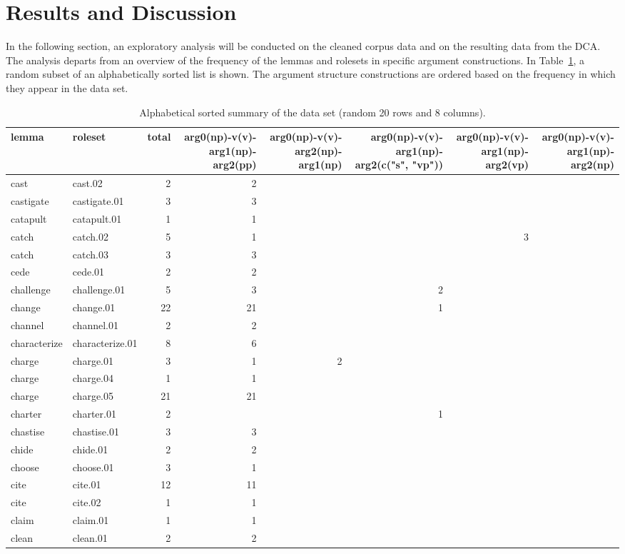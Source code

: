 \documentclass[
  letterpaper,
  DIV=11,
  numbers=noendperiod]{scrartcl}
\begin{document}
\hypertarget{results-and-discussion}{%
\section{Results and Discussion}\label{results-and-discussion}}

In the following section, an exploratory analysis will be conducted on
the cleaned corpus data and on the resulting data from the DCA. The
analysis departs from an overview of the frequency of the lemmas and
rolesets in specific argument constructions. In
Table~\ref{tbl-alph-summary}, a random subset of an alphabetically
sorted list is shown. The argument structure constructions are ordered
based on the frequency in which they appear in the data set.

\hypertarget{tbl-alph-summary}{}
\begin{table}
\caption{\label{tbl-alph-summary}Alphabetical sorted summary of the data set (random 20 rows and 8
columns). }\tabularnewline

\centering
\begin{tabular}[t]{llrrrrrr}
\toprule
lemma & roleset & total & arg0(np)-v(v)-arg1(np)-arg2(pp) & arg0(np)-v(v)-arg2(np)-arg1(np) & arg0(np)-v(v)-arg1(np)-arg2(c("s", "vp")) & arg0(np)-v(v)-arg1(np)-arg2(vp) & arg0(np)-v(v)-arg1(np)-arg2(np)\\
\midrule
cast & cast.02 & 2 & 2 &  &  &  & \\
castigate & castigate.01 & 3 & 3 &  &  &  & \\
catapult & catapult.01 & 1 & 1 &  &  &  & \\
catch & catch.02 & 5 & 1 &  &  & 3 & \\
catch & catch.03 & 3 & 3 &  &  &  & \\
\addlinespace
cede & cede.01 & 2 & 2 &  &  &  & \\
challenge & challenge.01 & 5 & 3 &  & 2 &  & \\
change & change.01 & 22 & 21 &  & 1 &  & \\
channel & channel.01 & 2 & 2 &  &  &  & \\
characterize & characterize.01 & 8 & 6 &  &  &  & \\
\addlinespace
charge & charge.01 & 3 & 1 & 2 &  &  & \\
charge & charge.04 & 1 & 1 &  &  &  & \\
charge & charge.05 & 21 & 21 &  &  &  & \\
charter & charter.01 & 2 &  &  & 1 &  & \\
chastise & chastise.01 & 3 & 3 &  &  &  & \\
\addlinespace
chide & chide.01 & 2 & 2 &  &  &  & \\
choose & choose.01 & 3 & 1 &  &  &  & \\
cite & cite.01 & 12 & 11 &  &  &  & \\
cite & cite.02 & 1 & 1 &  &  &  & \\
claim & claim.01 & 1 & 1 &  &  &  & \\
\addlinespace
clean & clean.01 & 2 & 2 &  &  &  & \\
\bottomrule
\end{tabular}
\end{table}
\end{document}
